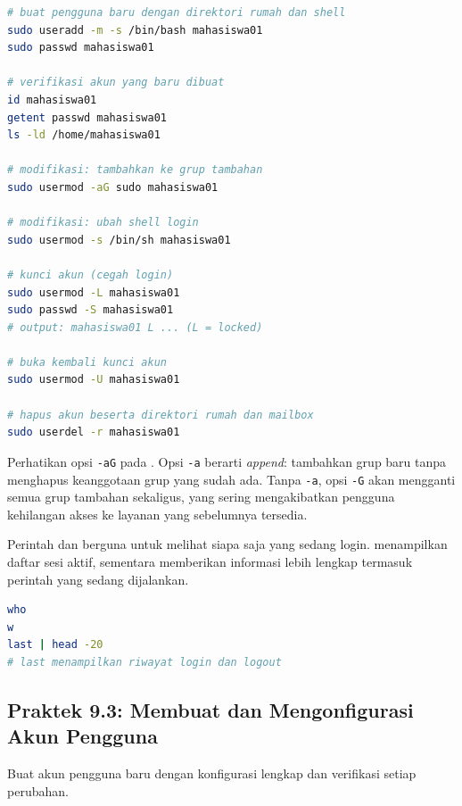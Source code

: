 \begin{lstlisting}[language=bash, caption={Siklus hidup akun pengguna}]
# buat pengguna baru dengan direktori rumah dan shell
sudo useradd -m -s /bin/bash mahasiswa01
sudo passwd mahasiswa01

# verifikasi akun yang baru dibuat
id mahasiswa01
getent passwd mahasiswa01
ls -ld /home/mahasiswa01

# modifikasi: tambahkan ke grup tambahan
sudo usermod -aG sudo mahasiswa01

# modifikasi: ubah shell login
sudo usermod -s /bin/sh mahasiswa01

# kunci akun (cegah login)
sudo usermod -L mahasiswa01
sudo passwd -S mahasiswa01
# output: mahasiswa01 L ... (L = locked)

# buka kembali kunci akun
sudo usermod -U mahasiswa01

# hapus akun beserta direktori rumah dan mailbox
sudo userdel -r mahasiswa01
\end{lstlisting}

Perhatikan opsi \texttt{-aG} pada . Opsi \texttt{-a} berarti \textit{append}: tambahkan grup baru tanpa menghapus keanggotaan grup yang sudah ada. Tanpa \texttt{-a}, opsi \texttt{-G} akan mengganti semua grup tambahan sekaligus, yang sering mengakibatkan pengguna kehilangan akses ke layanan yang sebelumnya tersedia.

Perintah  dan  berguna untuk melihat siapa saja yang sedang login.  menampilkan daftar sesi aktif, sementara  memberikan informasi lebih lengkap termasuk perintah yang sedang dijalankan.

\begin{lstlisting}[language=bash, caption={Memeriksa sesi pengguna aktif}]
who
w
last | head -20
# last menampilkan riwayat login dan logout
\end{lstlisting}

\subsection*{Praktek 9.3: Membuat dan Mengonfigurasi Akun Pengguna}

Buat akun pengguna baru dengan konfigurasi lengkap dan verifikasi setiap perubahan.

